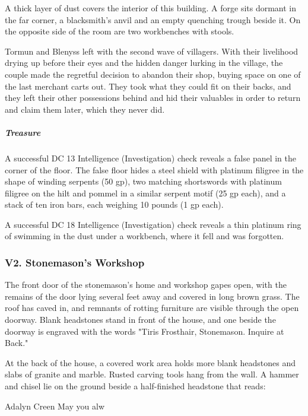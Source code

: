 \documentclass[10pt,a4paper,twoside,bg=print,twocolumn,openany,nodeprecatedcode]{dndbook}
\begin{document}
\begin{DndReadAloud}{}
A thick layer of dust covers the interior of this building. A forge sits dormant in the far corner, a blacksmith's anvil and an empty quenching trough beside it. On the opposite side of the room are two workbenches with stools.

\end{DndReadAloud}

Tormun and Blenyss left with the second wave of villagers. With their livelihood drying up before their eyes and the hidden danger lurking in the village, the couple made the regretful decision to abandon their shop, buying space on one of the last merchant carts out. They took what they could fit on their backs, and they left their other possessions behind and hid their valuables in order to return and claim them later, which they never did.

\subparagraph{Treasure}
A successful DC 13 Intelligence (Investigation) check reveals a false panel in the corner of the floor. The false floor hides a steel shield with platinum filigree in the shape of winding serpents (50 gp), two matching shortswords with platinum filigree on the hilt and pommel in a similar serpent motif (25 gp each), and a stack of ten iron bars, each weighing 10 pounds (1 gp each).

A successful DC 18 Intelligence (Investigation) check reveals a thin platinum ring of swimming in the dust under a workbench, where it fell and was forgotten.

\subsubsection{V2. Stonemason's Workshop}
The front door of the stonemason's home and workshop gapes open, with the remains of the door lying several feet away and covered in long brown grass. The roof has caved in, and remnants of rotting furniture are visible through the open doorway. Blank headstones stand in front of the house, and one beside the doorway is engraved with the words "Tiris Frosthair, Stonemason. Inquire at Back."

At the back of the house, a covered work area holds more blank headstones and slabs of granite and marble. Rusted carving tools hang from the wall. A hammer and chisel lie on the ground beside a half-finished headstone that reads:

\begin{DndSidebar}[float=!b]{Adalyn Creen}
May you alw



\end{DndSidebar}
\end{document}
